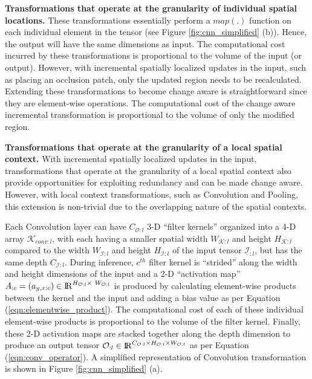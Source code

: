 \vspace{2mm}
\noindent \textbf{Transformations that operate at the granularity of individual  spatial locations.} These transformations essentially perform a $map(.)$ function on each individual element in the tensor (see Figure \ref{fig:cnn_simplified} (b)).
Hence, the output will have the same dimensions as input.
The computational cost incurred by these transformations is proportional to the volume of the input (or output).
However, with incremental spatially localized updates in the input, such as placing an occlusion patch, only the updated region needs to be recalculated.
Extending these transformations to become change aware is straightforward since they are element-wise operations.
The computational cost of the change aware incremental transformation is proportional to the volume of only the modified region.


\vspace{2mm}
\noindent \textbf{Transformations that operate at the granularity of a local spatial context.}
With incremental spatially localized updates in the input, transformations that operate at the granularity of a local spatial context also provide opportunities for exploiting redundancy and can be made change aware.
However, with local context transformations, such as Convolution and Pooling, this extension is non-trivial due to the overlapping nature of the spatial contexts.

Each Convolution layer can have $C_{\mathcal{O}:l}$ 3-D ``filter kernels'' organized into a 4-D array $\mathcal{K}_{conv:l}$, with each having a smaller spatial width $W_{\mathcal{K}:l}$ and height $H_{\mathcal{K}:l}$ compared to the width $W_{\mathcal{I}:l}$ and height $H_{\mathcal{I}:l}$ of the input tensor $\mathcal{I}_{:l}$, but has the same depth $C_{\mathcal{I}:l}$.
During inference, $c^{th}$ filter kernel is ``strided'' along the width and height dimensions of the input and a 2-D ``activation map'' $A_{:c}=(a_{y,x:c})\in \mathcal{\rm I\!R}^{H_{\mathcal{O}:l} \times~ W_{\mathcal{O}:l}}$ is produced by calculating element-wise products between the kernel and the input and adding a bias value as per Equation (\ref{eqn:elementwise_product}).
The computational cost of each of these individual element-wise products is proportional to the volume of the filter kernel.
Finally, these 2-D activation maps are stacked together along the depth dimension to produce an output tensor $\mathcal{O}_{:l} \in \mathcal{\rm I\!R}^{C_{\mathcal{O}:l} \times H_{\mathcal{O}:l} \times W_{\mathcal{O}:l}}$ as per Equation (\ref{eqn:conv_operator}).
A simplified representation of Convolution transformation is shown in Figure \ref{fig:cnn_simplified} (a).



